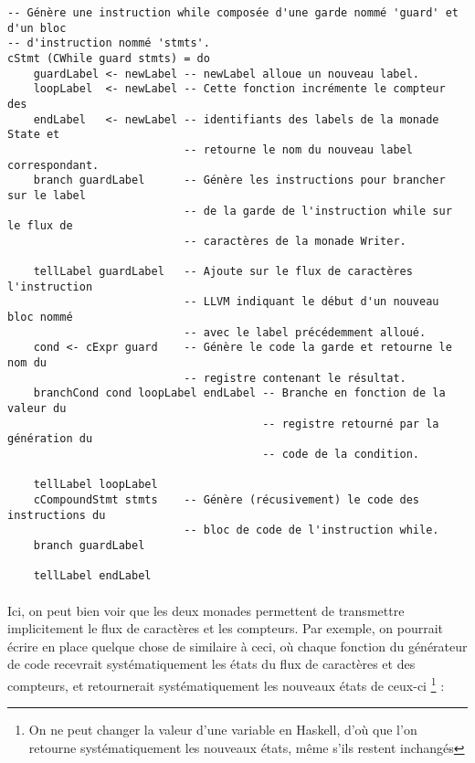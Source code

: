 \documentclass[a4paper]{article}
\begin{document}
    \begin{verbatim}
-- Génère une instruction while composée d'une garde nommé 'guard' et d'un bloc
-- d'instruction nommé 'stmts'.
cStmt (CWhile guard stmts) = do
    guardLabel <- newLabel -- newLabel alloue un nouveau label.
    loopLabel  <- newLabel -- Cette fonction incrémente le compteur des
    endLabel   <- newLabel -- identifiants des labels de la monade State et
                           -- retourne le nom du nouveau label correspondant.
    branch guardLabel      -- Génère les instructions pour brancher sur le label
                           -- de la garde de l'instruction while sur le flux de
                           -- caractères de la monade Writer.

    tellLabel guardLabel   -- Ajoute sur le flux de caractères l'instruction
                           -- LLVM indiquant le début d'un nouveau bloc nommé
                           -- avec le label précédemment alloué.
    cond <- cExpr guard    -- Génère le code la garde et retourne le nom du
                           -- registre contenant le résultat.
    branchCond cond loopLabel endLabel -- Branche en fonction de la valeur du
                                       -- registre retourné par la génération du
                                       -- code de la condition.

    tellLabel loopLabel
    cCompoundStmt stmts    -- Génère (récusivement) le code des instructions du
                           -- bloc de code de l'instruction while.
    branch guardLabel

    tellLabel endLabel
    \end{verbatim}

    \paragraph{}Ici, on peut bien voir que les deux monades permettent de
transmettre implicitement le flux de caractères et les compteurs. Par exemple,
on pourrait écrire en place quelque chose de similaire à ceci, où chaque
fonction du générateur de code recevrait systématiquement les états du flux de
caractères et des compteurs, et retournerait systématiquement les nouveaux états
de ceux-ci \footnote{On ne peut changer la valeur d'une variable en Haskell,
d'où que l'on retourne systématiquement les nouveaux états, même s'ils restent
inchangés}
:
\end{document}

